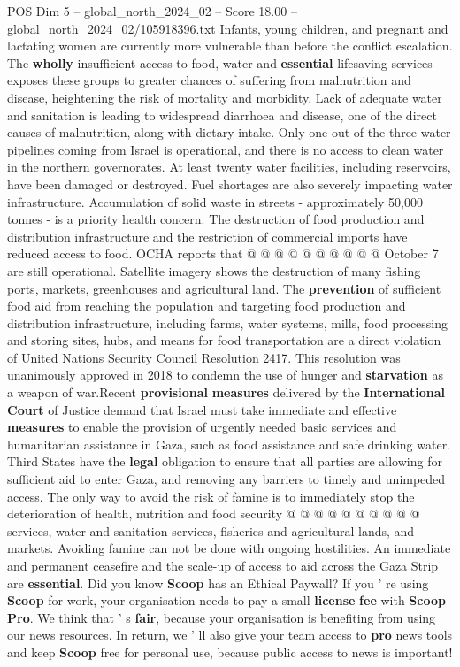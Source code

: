 \begin{textsample}{POS Dim 5 – global\_north\_2024\_02 – Score 18.00 – global\_north\_2024\_02/105918396.txt}
Infants, young children, and pregnant and lactating women are currently more vulnerable than before the conflict escalation.
The \textbf{wholly} insufficient access to food, water and \textbf{essential} lifesaving services exposes these groups to greater chances of suffering from malnutrition and disease, heightening the risk of mortality and morbidity.
Lack of adequate water and sanitation is leading to widespread diarrhoea and disease, one of the direct causes of malnutrition, along with dietary intake.
Only one out of the three water pipelines coming from Israel is operational, and there is no access to clean water in the northern governorates.
At least twenty water facilities, including reservoirs, have been damaged or destroyed.
Fuel shortages are also severely impacting water infrastructure.
Accumulation of solid waste in streets - approximately 50,000 tonnes - is a priority health concern.
The destruction of food production and distribution infrastructure and the restriction of commercial imports have reduced access to food.
OCHA reports that @ @ @ @ @ @ @ @ @ @ October 7 are still operational.
Satellite imagery shows the destruction of many fishing ports, markets, greenhouses and agricultural land.
The \textbf{prevention} of sufficient food aid from reaching the population and targeting food production and distribution infrastructure, including farms, water systems, mills, food processing and storing sites, hubs, and means for food transportation are a direct violation of United Nations Security Council Resolution 2417.
This resolution was unanimously approved in 2018 to condemn the use of hunger and \textbf{starvation} as a weapon of war.Recent \textbf{provisional} \textbf{measures} delivered by the \textbf{International} \textbf{Court} of Justice demand that Israel must take immediate and effective \textbf{measures} to enable the provision of urgently needed basic services and humanitarian assistance in Gaza, such as food assistance and safe drinking water.
Third States have the \textbf{legal} obligation to ensure that all parties are allowing for sufficient aid to enter Gaza, and removing any barriers to timely and unimpeded access.
The only way to avoid the risk of famine is to immediately stop the deterioration of health, nutrition and food security @ @ @ @ @ @ @ @ @ @ services, water and sanitation services, fisheries and agricultural lands, and markets.
Avoiding famine can not be done with ongoing hostilities.
An immediate and permanent ceasefire and the scale-up of access to aid across the Gaza Strip are \textbf{essential}.
Did you know \textbf{Scoop} has an Ethical Paywall?
If you ' re using \textbf{Scoop} for work, your organisation needs to pay a small \textbf{license} \textbf{fee} with \textbf{Scoop} \textbf{Pro}.
We think that ' s \textbf{fair}, because your organisation is benefiting from using our news resources.
In return, we ' ll also give your team access to \textbf{pro} news tools and keep \textbf{Scoop} free for personal use, because public access to news is important!

\end{textsample}
